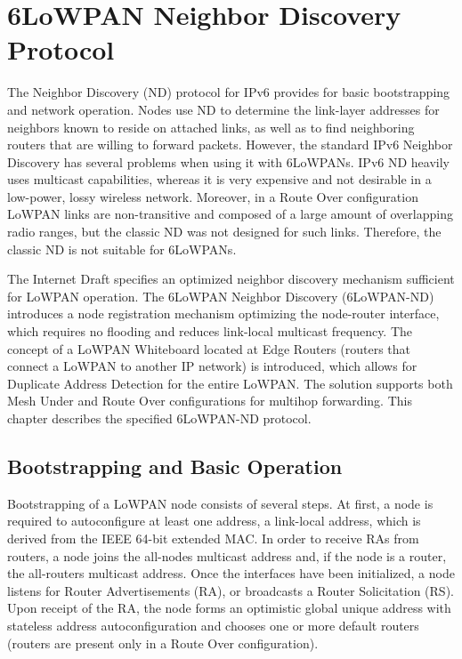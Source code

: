 \chapter{6LoWPAN Neighbor Discovery Protocol}\label{ch:nd}
The Neighbor Discovery (ND) protocol for IPv6 \cite{rfc4861} provides for basic bootstrapping and network operation. Nodes use ND to determine the link-layer addresses for neighbors known to reside on attached links, as well as to find neighboring routers that are willing to forward packets. However, the standard IPv6 Neighbor Discovery has several problems when using it with 6LoWPANs. IPv6 ND heavily uses multicast capabilities, whereas it is very expensive and not desirable in a low-power, lossy wireless network. Moreover, in a Route Over configuration LoWPAN links are non-transitive and composed of a large amount of overlapping radio ranges, but the classic ND was not designed for such links. Therefore, the classic ND is not suitable for 6LoWPANs. 

The Internet Draft \cite{draft-nd-07} specifies an optimized neighbor discovery mechanism sufficient for LoWPAN operation. The 6LoWPAN Neighbor Discovery (6LoWPAN-ND) introduces a node registration mechanism optimizing the node-router interface, which requires no flooding and reduces link-local multicast frequency.  The concept of a LoWPAN Whiteboard located at Edge Routers (routers that connect a LoWPAN to another IP network) is introduced, which allows for Duplicate Address Detection for the entire LoWPAN. The solution supports both Mesh Under and Route Over configurations for multihop forwarding. This chapter describes the specified 6LoWPAN-ND protocol.


\section{Bootstrapping and Basic Operation}
Bootstrapping of a LoWPAN node consists of several steps.  At first, a node is required to autoconfigure at least one address, a link-local address, which is derived from the IEEE 64-bit extended MAC. In order to receive RAs from routers, a node joins the all-nodes multicast address and, if the node is a router, the all-routers multicast address. Once the interfaces have been initialized, a node listens for Router Advertisements (RA), or broadcasts a Router Solicitation (RS). Upon receipt of the RA, the node forms an optimistic global unique address with stateless address autoconfiguration and chooses one or more default routers (routers are present only in a Route Over configuration). 

